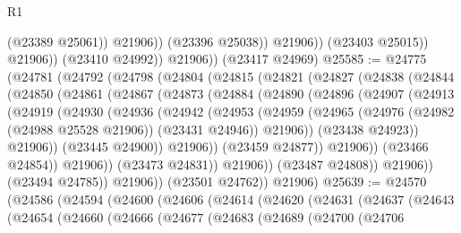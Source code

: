 \begin{lexlean}{R1}
\begin{coremodule}
                            (@23389 @25061))
                          @21906))
                      (@23396 @25038))
                    @21906))
                (@23403 @25015))
              @21906))
          (@23410 @24992))
        @21906))
    (@23417 @24969)
@25585 := @24775
    (@24781
      (@24792
        (@24798
          (@24804
            (@24815
              (@24821
                (@24827
                  (@24838
                    (@24844
                      (@24850
                        (@24861
                          (@24867
                            (@24873
                              (@24884
                                (@24890
                                  (@24896
                                    (@24907
                                      (@24913
                                        (@24919
                                          (@24930
                                            (@24936
                                              (@24942
                                                (@24953
                                                  (@24959
                                                    (@24965
                                                      (@24976
                                                        (@24982 (@24988 @25528 @21906))
                                                        (@23431 @24946))
                                                      @21906))
                                                  (@23438 @24923))
                                                @21906))
                                            (@23445 @24900))
                                          @21906))
                                      (@23459 @24877))
                                    @21906))
                                (@23466 @24854))
                              @21906))
                          (@23473 @24831))
                        @21906))
                    (@23487 @24808))
                  @21906))
              (@23494 @24785))
            @21906))
        (@23501 @24762))
      @21906)
@25639 := @24570
    (@24586
      (@24594
        (@24600
          (@24606
            (@24614
              (@24620
                (@24631
                  (@24637
                    (@24643
                      (@24654
                        (@24660
                          (@24666
                            (@24677
                              (@24683
                                (@24689
                                  (@24700
                                    (@24706

\end{coremodule}
\end{lexlean}
